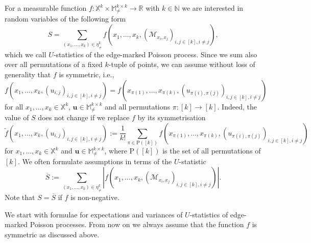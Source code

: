 \documentclass{article}
\theoremstyle{definition}
\numberwithin{equation}{section}
\theoremstyle{remark}
\begin{document}
For a measurable function $f: \mathbb{X}^k\times \mathbb{M}^{k\times k}_{\neq}\to\mathbb{R}$ with $k\in\mathbb{N}$ we are interested in random variables of the following form
\begin{equation}\label{def:ustat}
	S=\sum_{(x_1,\ldots,x_k)\in\eta^k_{\neq}} f(x_1,\ldots,x_k, (\mathcal{M}_{x_i,x_j})_{i,j\in[k], i\neq j}),
\end{equation}
which we call $U$-statistics of the edge-marked Poisson process. Since we sum also over all permutations of a fixed $k$-tuple of points, we can assume without loss of generality that $f$ is symmetric, i.e., 
$$
f(x_1,\ldots,x_k, (u_{i,j})_{i,j\in[k],i\neq j})=f(x_{\pi(1)},\ldots,x_{\pi(k)}, (u_{\pi(i),\pi(j)})_{i,j\in[k],i\neq j})
$$
for all $x_1,\ldots,x_k\in\mathbb{X}^k$, $\mathbf{u}\in\mathbb{M}^{k\times k}_{\neq}$ and all permutations $\pi:[k]\to[k]$. Indeed, the value of $S$ does not change if we replace $f$ by its symmetrisation
$$
\widetilde{f}(x_1,\ldots,x_k, (u_{i,j})_{i,j\in[k],i\neq j}):=\frac{1}{k!}\sum_{\pi\in \mathrm{P}([k])}f(x_{\pi(1)},\ldots,x_{\pi(k)}, (u_{\pi(i),\pi(j)})_{i,j\in[k],i\neq j})
$$
for $x_1,\ldots,x_k\in\mathbb{X}^k$ and $\mathbf{u}\in\mathbb{M}^{k\times k}_{\neq}$, where $\mathrm{P}([k])$ is the set of all permutations of $[k]$.
We often formulate assumptions in terms of the $U$-statistic
\begin{equation}\label{def-integ1}
	\overline{S}:=\sum_{(x_1,\ldots,x_k)\in\eta^k_{\neq}} \left|f(x_1,\ldots,x_k, (\mathcal{M}_{x_i,x_j})_{i,j\in[k], i\neq j})\right|.
\end{equation}
Note that $S=\overline{S}$ if $f$ is non-negative.

We start with formulae for expectations and variances of $U$-statistics of edge-marked Poisson processes. From now on we always assume that the function $f$ is symmetric as discussed above.
\end{document}
